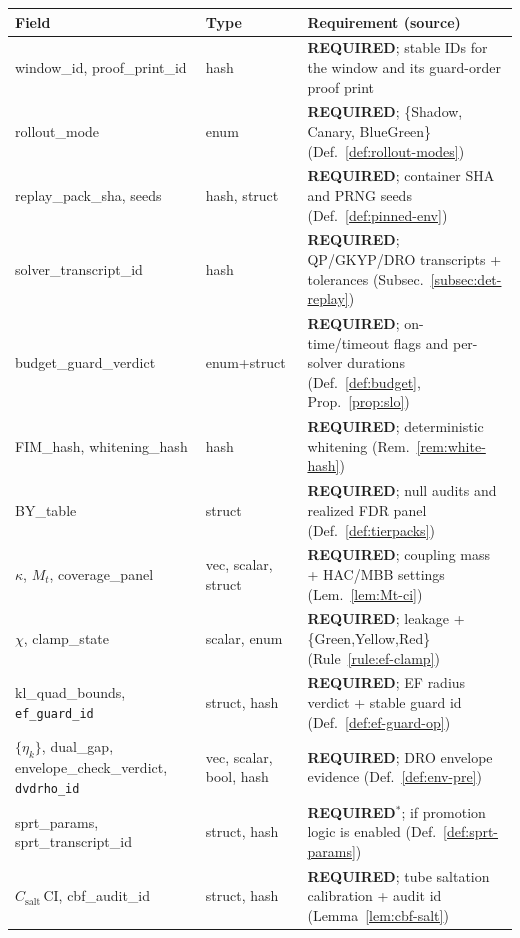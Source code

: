 \begin{table}[t]
\centering
\renewcommand{\arraystretch}{1.08}
\begin{tabularx}{\textwidth}{@{}>{\raggedright\arraybackslash}p{3.7cm} >{\raggedright\arraybackslash}p{2.9cm} >{\raggedright\arraybackslash}X@{}}
\toprule
\textbf{Field} & \textbf{Type} & \textbf{Requirement (source)} \\
\midrule
window\_id, proof\_print\_id & hash & \textbf{REQUIRED}; stable IDs for the window and its guard-order proof print \\
rollout\_mode & enum & \textbf{REQUIRED}; \{Shadow, Canary, BlueGreen\} (Def.~\ref{def:rollout-modes}) \\
replay\_pack\_sha, seeds & hash, struct & \textbf{REQUIRED}; container SHA and PRNG seeds (Def.~\ref{def:pinned-env}) \\
solver\_transcript\_id & hash & \textbf{REQUIRED}; QP/GKYP/DRO transcripts + tolerances (Subsec.~\ref{subsec:det-replay}) \\
budget\_guard\_verdict & enum+struct & \textbf{REQUIRED}; on-time/timeout flags and per-solver durations (Def.~\ref{def:budget}, Prop.~\ref{prop:slo}) \\
FIM\_hash, whitening\_hash & hash & \textbf{REQUIRED}; deterministic whitening (Rem.~\ref{rem:white-hash}) \\
BY\_table & struct & \textbf{REQUIRED}; null audits and realized FDR panel (Def.~\ref{def:tierpacks}) \\
$\kappa$, $M_t$, coverage\_panel & vec, scalar, struct & \textbf{REQUIRED}; coupling mass + HAC/MBB settings (Lem.~\ref{lem:Mt-ci}) \\
$\chi$, clamp\_state & scalar, enum & \textbf{REQUIRED}; leakage + \{Green,Yellow,Red\} (Rule~\ref{rule:ef-clamp}) \\
kl\_quad\_bounds, \texttt{ef\_guard\_id} & struct, hash & \textbf{REQUIRED}; EF radius verdict + stable guard id (Def.~\ref{def:ef-guard-op}) \\
$\{\eta_k\}$, dual\_gap, envelope\_check\_verdict, \texttt{dvdrho\_id} & vec, scalar, bool, hash & \textbf{REQUIRED}; DRO envelope evidence (Def.~\ref{def:env-pre}) \\
sprt\_params, sprt\_transcript\_id & struct, hash & \textbf{REQUIRED\(^\ast\)}; if promotion logic is enabled (Def.~\ref{def:sprt-params}) \\
$C_{\text{salt}}$\,CI, cbf\_audit\_id & struct, hash & \textbf{REQUIRED}; tube saltation calibration + audit id (Lemma~\ref{lem:cbf-salt}) \\

\end{tabularx}
\end{table}
